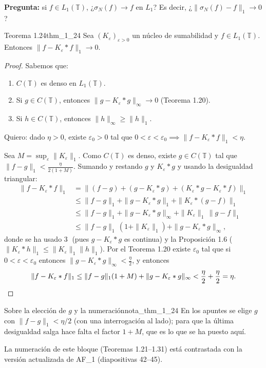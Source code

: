 \textbf{Pregunta:} si $f \in L_1(\mathbb{T})$, ¿$\sigma_N(f) \to f$ en $L_1$? Es decir, ¿$\|\sigma_N(f) - f\|_1 \to 0$?

\begin{teorema}{Teorema 1.24}{thm_1_24}
Sea $(K_\varepsilon)_{\varepsilon>0}$ un núcleo de sumabilidad y $f \in L_1(\mathbb{T})$. Entonces $\|f - K_\varepsilon * f\|_1 \to 0$.
\end{teorema}

\begin{proof}
Sabemos que:
\begin{enumerate}
\item[\textcircled{1}] $C(\mathbb{T})$ es denso en $L_1(\mathbb{T})$.
\item[\textcircled{2}] Si $g \in C(\mathbb{T})$, entonces $\|g - K_\varepsilon * g\|_\infty \to 0$ (Teorema 1.20).
\item[\textcircled{3}] Si $h \in C(\mathbb{T})$, entonces $\|h\|_\infty \ge \|h\|_1$.
\end{enumerate}
Quiero: dado $\eta > 0$, existe $\varepsilon_0 > 0$ tal que $0 < \varepsilon < \varepsilon_0 \implies \|f - K_\varepsilon * f\|_1 < \eta$.

Sea $M = \sup_\varepsilon \|K_\varepsilon\|_1$. Como $C(\mathbb{T})$ es denso, existe $g \in C(\mathbb{T})$ tal que $\|f - g\|_1 < \frac{\eta}{2(1+M)}$. Sumando y restando $g$ y $K_\varepsilon * g$ y usando la desigualdad triangular:
\begin{align*}
\|f - K_\varepsilon * f\|_1 &= \|(f-g) + (g - K_\varepsilon * g) + (K_\varepsilon * g - K_\varepsilon * f)\|_1 \\
&\le \|f-g\|_1 + \|g - K_\varepsilon * g\|_1 + \|K_\varepsilon * (g-f)\|_1 \\
&\le \|f-g\|_1 + \|g - K_\varepsilon * g\|_\infty + \|K_\varepsilon\|_1\,\|g-f\|_1 \\
&\le \|f-g\|_1\,(1 + \|K_\varepsilon\|_1) + \|g - K_\varepsilon * g\|_\infty,
\end{align*}
donde se ha usado \textcircled{3} (pues $g - K_\varepsilon * g$ es continua) y la Proposición 1.6 ($\|K_\varepsilon * h\|_1 \le \|K_\varepsilon\|_1\|h\|_1$). Por el Teorema 1.20 existe $\varepsilon_0$ tal que si $0 < \varepsilon < \varepsilon_0$ entonces $\|g - K_\varepsilon * g\|_\infty < \frac{\eta}{2}$, y entonces
\[
\|f - K_\varepsilon * f\|_1 \le \|f-g\|_1(1 + M) + \|g - K_\varepsilon * g\|_\infty < \frac{\eta}{2} + \frac{\eta}{2} = \eta. \qedhere
\]
\end{proof}

\begin{nota}{Sobre la elección de $g$ y la numeración}{nota_thm_1_24}
En los apuntes se elige $g$ con $\|f-g\|_1 < \eta/2$ (con una interrogación al lado); para que la última desigualdad salga hace falta el factor $1+M$, que es lo que se ha puesto aquí.

La numeración de este bloque (Teoremas 1.21--1.31) está contrastada con la versión actualizada de AF\_1 (diapositivas 42--45).
\end{nota}

